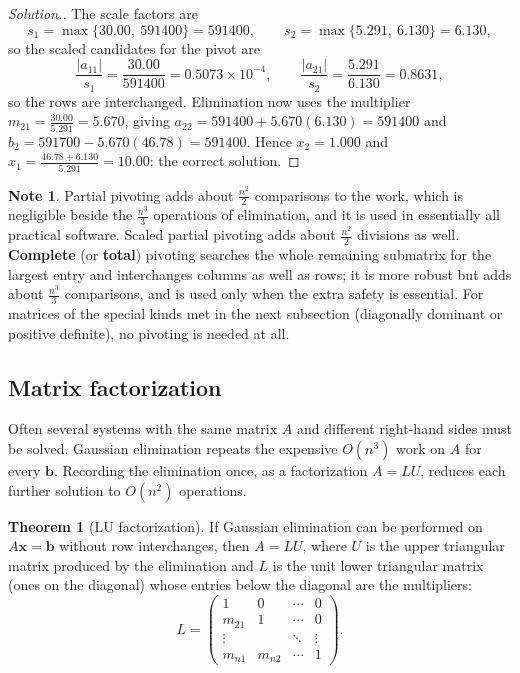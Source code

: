 \documentclass[11pt,a4paper]{article}
\numberwithin{equation}{section}
\theoremstyle{definition}
\newtheorem{thm}{Theorem}[subsection]
\newtheorem*{note}{Note}
\newenvironment{solution}
  {\renewcommand{\qedsymbol}{}\begin{proof}[\textit{Solution}.]}
  {\end{proof}}
\begin{document}
\begin{solution}
The scale factors are
$$s_1 = \max\{30.00,\ 591400\} = 591400,\qquad s_2 = \max\{5.291,\ 6.130\} = 6.130 ,$$
so the scaled candidates for the pivot are
$$\frac{|a_{11}|}{s_1} = \frac{30.00}{591400} = 0.5073\times10^{-4},\qquad\frac{|a_{21}|}{s_2} = \frac{5.291}{6.130} = 0.8631,$$
so the rows are interchanged. Elimination now uses the multiplier $m_{21} = \frac{30.00}{5.291} = 5.670$, giving $a_{22} = 591400+5.670(6.130)
= 591400$ and $b_2 = 591700-5.670(46.78) = 591400$. Hence $x_2 = 1.000$ and $x_1 = \frac{46.78+6.130}{5.291} = 10.00$: the correct solution.
\end{solution}

\begin{note}
Partial pivoting adds about $\frac{n^2}{2}$ comparisons to the work, which is negligible beside the $\frac{n^3}3$ operations of elimination,
and it is used in essentially all practical software. Scaled partial pivoting adds about $\frac{n^2}{2}$ divisions as well. \textbf{Complete}
(or \textbf{total}) pivoting searches the whole remaining submatrix for the largest entry and interchanges columns as well as rows; it is
more robust but adds about $\frac{n^3}{3}$ comparisons, and is used only when the extra safety is essential. For matrices of the special
kinds met in the next subsection (diagonally dominant or positive definite), no pivoting is needed at all.
\end{note}


\subsection{Matrix factorization}
\label{sec:lu}

Often several systems with the same matrix $A$ and different right-hand sides must be solved. Gaussian elimination repeats the expensive
$O(n^3)$ work on $A$ for every $\mathbf b$. Recording the elimination once, as a factorization $A = LU$, reduces each further solution to
$O(n^2)$ operations.

\begin{thm}[LU factorization]
\label{thm:lu}
If Gaussian elimination can be performed on $A\mathbf x = \mathbf b$ without row interchanges, then $A = LU$, where $U$ is the upper
triangular matrix produced by the elimination and $L$ is the unit lower triangular matrix (ones on the diagonal) whose entries below the
diagonal are the multipliers:
$$L = \begin{pmatrix}1&0&\cdots&0\\ m_{21}&1&\cdots&0\\ \vdots&&\ddots&\vdots\\ m_{n1}&m_{n2}&\cdots&1\end{pmatrix}.$$
\end{thm}
\end{document}
